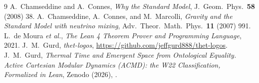 \documentclass[aps,prd,twocolumn,superscriptaddress,showpacs]{revtex4-2}
\begin{document}
\begin{thebibliography}{9}
 A.~Chamseddine and A.~Connes,
\textit{Why the Standard Model}, J.\ Geom.\ Phys.\ \textbf{58} (2008) 38.
 A.~Chamseddine, A.~Connes, and M.~Marcolli,
\textit{Gravity and the Standard Model with neutrino mixing},
Adv.\ Theor.\ Math.\ Phys.\ \textbf{11} (2007) 991.
 L.~de Moura \textit{et al.}, \textit{The Lean 4
Theorem Prover and Programming Language}, 2021.
 J.~M.~Gurd, \textit{thet-logos},
\url{https://github.com/jeffgurd888/thet-logos}.
 J.~M.~Gurd, \textit{Thermal Time and Emergent
Space from Ontological Equality. Active Cartesian Modular
Dynamics (ACMD): the W22 Classification, Formalized in Lean},
Zenodo (2026), .
\end{thebibliography}
\end{document}
